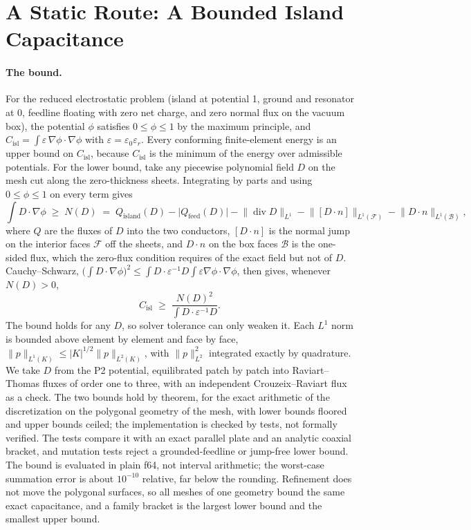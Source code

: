 \documentclass{anvil-paper}
\newcommand{\Cisl}{C_{\mathrm{isl}}}
\begin{document}
\section{A Static Route: A Bounded Island Capacitance}
\label{sec:static}

\paragraph{The bound.}
For the reduced electrostatic problem (island at potential 1, ground and
resonator at 0, feedline floating with zero net charge, and zero normal
flux on the vacuum box), the potential
$\phi$ satisfies $0 \le \phi \le 1$ by the maximum principle, and
$\Cisl = \int \varepsilon\,\nabla\phi\cdot\nabla\phi$ with $\varepsilon
= \varepsilon_0\varepsilon_r$. Every conforming finite-element energy is an
upper bound on $\Cisl$, because $\Cisl$ is the minimum of the energy
over admissible potentials. For the lower bound, take any piecewise
polynomial field $D$ on the mesh cut along the zero-thickness sheets.
Integrating by parts and using $0\le\phi\le1$ on every term gives
\begin{equation}
  \int D\cdot\nabla\phi \;\ge\; N(D) \;=\; Q_{\mathrm{island}}(D)
  - \lvert Q_{\mathrm{feed}}(D)\rvert
  - \lVert \operatorname{div} D\rVert_{L^1}
  - \lVert [D\cdot n]\rVert_{L^1(\mathcal F)}
  - \lVert D\cdot n\rVert_{L^1(\mathcal B)},
  \label{eq:cert-n}
\end{equation}
where $Q$ are the fluxes of $D$ into the two conductors,
$[D\cdot n]$ is the normal jump on the interior faces $\mathcal F$ off
the sheets, and $D\cdot n$ on the box faces $\mathcal B$ is the one-sided
flux, which the zero-flux condition requires of the exact field but not
of $D$. Cauchy--Schwarz, $\bigl(\int D\cdot\nabla\phi\bigr)^2 \le
\int D\cdot\varepsilon^{-1}D \int\varepsilon\nabla\phi\cdot\nabla\phi$,
then gives, whenever $N(D) > 0$,
\begin{equation}
  \Cisl \;\ge\; \frac{N(D)^2}{\int D\cdot\varepsilon^{-1}D}.
  \label{eq:cert}
\end{equation}
The bound holds for any $D$, so solver tolerance can only weaken it. Each
$L^1$ norm is bounded above element by element and face by face,
$\lVert p\rVert_{L^1(K)} \le |K|^{1/2}\lVert p\rVert_{L^2(K)}$, with
$\lVert p\rVert_{L^2}^2$ integrated exactly by quadrature. We
take $D$ from the P2 potential, equilibrated patch by patch into
Raviart--Thomas fluxes of order one to three, with an independent
Crouzeix--Raviart flux as a check. The two bounds hold by theorem, for the
exact arithmetic of the discretization on the polygonal geometry of the
mesh, with lower bounds floored and upper bounds ceiled; the implementation
is checked by tests, not formally verified. The tests compare it with an
exact parallel plate and an analytic coaxial bracket, and mutation tests
reject a grounded-feedline or jump-free lower bound. The bound is evaluated
in plain f64, not interval arithmetic; the worst-case summation error is about
$10^{-10}$ relative, far below the rounding. Refinement does not move the
polygonal surfaces, so all meshes of one geometry bound the same exact
capacitance, and a family bracket is the largest lower bound and the
smallest upper bound.
\end{document}

